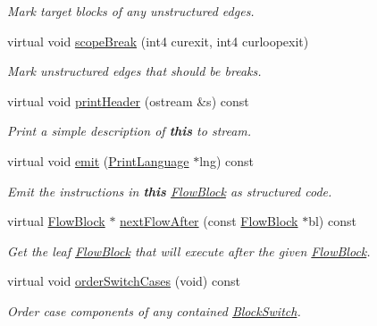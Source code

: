 \begin{DoxyCompactItemize}
\begin{DoxyCompactList}\small\item\em Mark target blocks of any unstructured edges. \end{DoxyCompactList}\item 
virtual void \mbox{\hyperlink{class_block_switch_a85ad912114b4e2ac355ac2bc2f3be12c}{scope\+Break}} (int4 curexit, int4 curloopexit)
\begin{DoxyCompactList}\small\item\em Mark unstructured edges that should be {\itshape breaks}. \end{DoxyCompactList}\item 
virtual void \mbox{\hyperlink{class_block_switch_a57143ab3d1cea8c6962bdcf52fbe4bdf}{print\+Header}} (ostream \&s) const
\begin{DoxyCompactList}\small\item\em Print a simple description of {\bfseries{this}} to stream. \end{DoxyCompactList}\item 
virtual void \mbox{\hyperlink{class_block_switch_ad1102b97e80c4dd7afa66891eb67a0d6}{emit}} (\mbox{\hyperlink{class_print_language}{Print\+Language}} $\ast$lng) const
\begin{DoxyCompactList}\small\item\em Emit the instructions in {\bfseries{this}} \mbox{\hyperlink{class_flow_block}{Flow\+Block}} as structured code. \end{DoxyCompactList}\item 
virtual \mbox{\hyperlink{class_flow_block}{Flow\+Block}} $\ast$ \mbox{\hyperlink{class_block_switch_ae13e717fc62265c1f9b5024cb0e9cd1a}{next\+Flow\+After}} (const \mbox{\hyperlink{class_flow_block}{Flow\+Block}} $\ast$bl) const
\begin{DoxyCompactList}\small\item\em Get the leaf \mbox{\hyperlink{class_flow_block}{Flow\+Block}} that will execute after the given \mbox{\hyperlink{class_flow_block}{Flow\+Block}}. \end{DoxyCompactList}\item 
virtual void \mbox{\hyperlink{class_block_switch_a3413057234f7606357b6037a516627a6}{order\+Switch\+Cases}} (void) const
\begin{DoxyCompactList}\small\item\em Order {\itshape case} components of any contained \mbox{\hyperlink{class_block_switch}{Block\+Switch}}. \end{DoxyCompactList}\end{DoxyCompactItemize}
